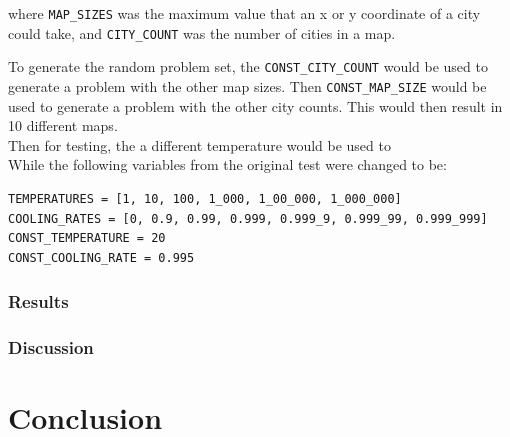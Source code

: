 \documentclass{article}
\begin{document}
where \texttt{MAP\_SIZES} was the maximum value that an x or y coordinate of a city could take, and \texttt{CITY\_COUNT} was the number of cities in a map.

To generate the random problem set, the \texttt{CONST\_CITY\_COUNT} would be used to generate a problem with the other map sizes.
Then \texttt{CONST\_MAP\_SIZE} would be used to generate a problem with the other city counts.
This would then result in 10 different maps.
\\

Then for testing, the a different temperature would be used to 
\\

While the following variables from the original test were changed to be:

\begin{verbatim}
TEMPERATURES = [1, 10, 100, 1_000, 1_00_000, 1_000_000]
COOLING_RATES = [0, 0.9, 0.99, 0.999, 0.999_9, 0.999_99, 0.999_999]
CONST_TEMPERATURE = 20
CONST_COOLING_RATE = 0.995
\end{verbatim}

\subsubsection{Results}

\subsubsection{Discussion}

\newpage
\section{Conclusion}



\newpage
\end{document}
